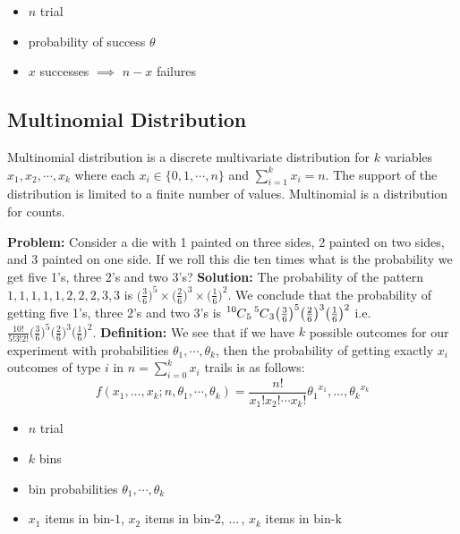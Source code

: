 \documentclass{article}
\newcommand\Mycomb[2][^n]{\prescript{#1\mkern-0.5mu}{}C_{#2}}
\begin{document}
\begin{itemize}
\item $n$ trial
\item probability of success $\theta$
\item $x$ successes $\implies$ $n-x$ failures
\end{itemize}

\subsection{Multinomial Distribution}
Multinomial distribution is a discrete multivariate distribution for $k$ variables $x_1,x_2,\cdots, x_k$ 
where each $x_i \in \{ 0, 1, \cdots , n \}$ and $\sum_{i=1}^{k} x_i = n$.
The support of the distribution is limited to a finite number of values. Multinomial is a distribution for counts.



\textbf{Problem:} Consider a die with 1 painted on three sides, 2 painted on two sides, and 3 painted on one side. If we roll this die ten times what is the probability we get five 1's, three 2's and two 3's? \newline
\textbf{Solution:} The probability of the pattern $1,1,1,1,1,2,2,2,3,3$ is $\big(\frac{3}{6}\big)^5 \times \big(\frac{2}{6}\big)^3 \times \big( \frac{1}{6}\big)^2$. We conclude that the probability of getting five 1's, three 2's and two 3's is $\Mycomb[10]{5}\Mycomb[5]{3}\big(\frac{3}{6}\big)^5\big(\frac{2}{6}\big)^3\big( \frac{1}{6}\big)^2$  i.e.\ $\frac{10!}{5!3!2!}\big(\frac{3}{6}\big)^5\big(\frac{2}{6}\big)^3\big( \frac{1}{6}\big)^2$. 
\newline
\textbf{Definition:} We see that if we have $k$ possible outcomes for our experiment with probabilities ${\theta}_1,\cdots,{\theta}_k$, then the probability of getting exactly $x_i$ outcomes of type $i$ in $n = {\sum}_{i=0}^{k}{x_i}$ trails is as follows: \newline \[f(x_1,\dots,x_k;n,{\theta}_1,\cdots,{\theta}_k) = \frac{n!}{x_1!x_2!\cdots x_k!}{\theta_1}^{x_1},\dots,{\theta_k}^{x_k}\]

\begin{itemize}
\item $n$ trial
\item $k$ bins
\item bin probabilities ${\theta}_1,\cdots,{\theta}_k$
\item $x_1$ items in $\text{bin-1}$, $x_2$ items in $\text{bin-2}$, $\dots \,$, $x_k$ items in $\text{bin-k}$
\end{itemize}
\end{document}
